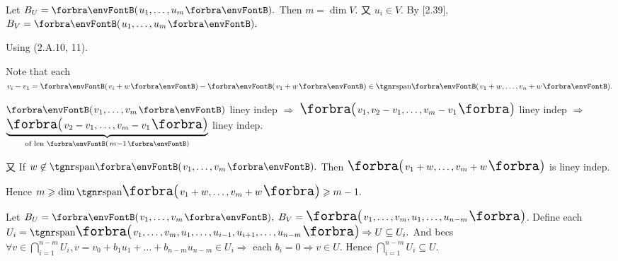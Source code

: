 Let $B_U=\Par{u_1,\dots,u_m}.$ Then $m=\dim V.$ 又 $u_i\in V.$ By [2.39], $B_V=\Par{u_1,\dots,u_m}.$\PfEnd\vspace{-2pt}
\SepLine[-2pt]

\SepLine

Using (2.A.10, 11).\par\quad
Note that each $v_i-v_1=\Par{v_i+w}-\Par{v_1+w}\in\Span{v_1+w,\dots,v_n+w}.$\par\quad
$\Par{v_1,\dots,v_m}$ liney indep $\Rightarrow$ $\BigPar{v_1,v_2-v_1,\dots,v_m-v_1}$ liney indep $\Rightarrow$ $\underbrace{\BigPar{v_2-v_1,_{}\dots,v_m-v_1}}_{\text{of len }\SmallPar{m-1}}$ liney indep.\vspace{-15pt}\par\quad
又 If $w\not\in\Span{v_1,\dots,v_m}.$ Then $\BigPar{v_1+w,\dots,v_m+w}$ is liney indep.\par\quad
Hence $m\geqslant\dim\Span[\BigPar]{v_1+w,\dots,v_m+w}\geqslant m-1.$\PfEnd
\SepLine

Let $B_U=\Par{v_1,\dots,v_m},\;B_V=\BigPar{v_1,\dots,v_m,u_1,\dots,u_{n-m}}$.\parSol{}
Define each $U_i=\Span[\BigPar]{v_1,\dots,v_m,u_1,\dots,u_{i-1},u_{i+1},\dots,u_{n-m}}\Rightarrow U\subseteq U_i.$\vspace{4pt}\parSol{}
And becs $\forall v\in \bigcap\limits_{i=1}^{n-m}U_i,v=v_0+b_1 u_1+\dots+b_{n-m} u_{n-m}\in U_i\Rightarrow$ each $b_i=0\Rightarrow v\in U.$\vspace{-4pt}\parSol{}
Hence $\bigcap\limits_{i=1}^{n-m}U_i\subseteq U.$\PfEnd
\SepLine


